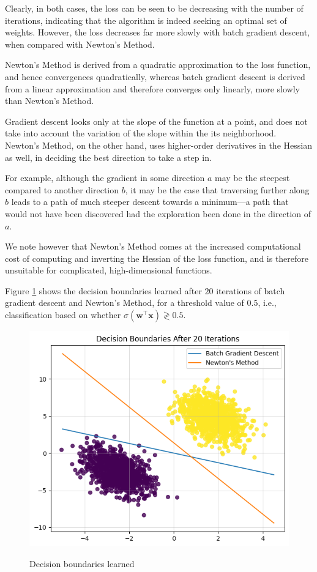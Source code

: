 \documentclass{article}[a4paper]
\begin{document}
	Clearly, in both cases, the loss can be seen to be decreasing with the number of iterations, indicating that the algorithm is indeed seeking an optimal set of weights. However, the loss decreases far more slowly with batch gradient descent, when compared with Newton's Method.

	Newton's Method is derived from a quadratic approximation to the loss function, and hence convergences quadratically, whereas batch gradient descent is derived from a linear approximation and therefore converges only linearly, more slowly than Newton's Method.

	Gradient descent looks only at the slope of the function at a point, and does not take into account the variation of the slope within the its neighborhood. Newton's Method, on the other hand, uses higher-order derivatives in the Hessian as well, in deciding the best direction to take a step in.

	For example, although the gradient in some direction $a$ may be the steepest compared to another direction $b$, it may be the case that traversing further along $b$ leads to a path of much steeper descent towards a minimum---a path that would not have been discovered had the exploration been done in the direction of $a$.

	We note however that Newton's Method comes at the increased computational cost of computing and inverting the Hessian of the loss function, and is therefore unsuitable for complicated, high-dimensional functions.

	Figure \ref{q3_5_2} shows the decision boundaries learned after $20$ iterations of batch gradient descent and Newton's Method, for a threshold value of $0.5$, i.e., classification based on whether $\sigma\left( \mathbf{w}^\top \mathbf{x} \right) \gtrless 0.5$.
	
	\begin{figure}[H]
		\centering
		\includegraphics[width=0.8\linewidth]{images/q3_5_2.png}
		\label{q3_5_2}
		\caption{Decision boundaries learned}
	\end{figure}
	
\end{document}
